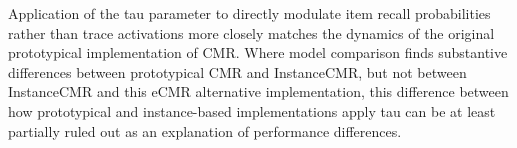 {}Application of the \markdownRendererDollarSign{}\markdownRendererBackslash{}tau\markdownRendererDollarSign{} parameter to directly modulate item recall probabilities rather than trace activations more closely matches the dynamics of the original prototypical implementation of CMR. Where model comparison finds substantive differences between prototypical CMR and InstanceCMR, but not between InstanceCMR and this eCMR alternative implementation, this difference between how prototypical and instance-based implementations apply \markdownRendererDollarSign{}\markdownRendererBackslash{}tau\markdownRendererDollarSign{} can be at least partially ruled out as an explanation of performance differences.\relax
